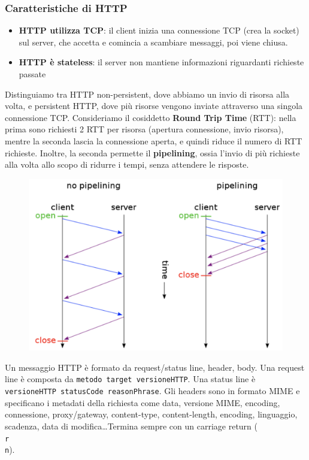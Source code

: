 \documentclass[11pt]{article}
\newcommand{\code}[1]{\texttt{#1}}
\begin{document}
\subsubsection{Caratteristiche di HTTP}
\begin{itemize}
    \item \textbf{HTTP utilizza TCP}: il client inizia una connessione TCP (crea la socket) sul server, che accetta e comincia a scambiare messaggi, poi viene chiusa.
    \item \textbf{HTTP è stateless}: il server non mantiene informazioni riguardanti richieste passate 
\end{itemize}
Distinguiamo tra HTTP non-persistent, dove abbiamo un invio di risorsa alla volta, e persistent HTTP, dove più risorse vengono inviate attraverso una singola connessione TCP. Consideriamo il cosiddetto \textbf{Round Trip Time} (RTT): nella prima sono richiesti 2 RTT per risorsa (apertura connessione, invio risorsa), mentre la seconda lascia la connessione aperta, e quindi riduce il numero di RTT richieste. Inoltre, la seconda permette il \textbf{pipelining}, ossia l'invio di più richieste alla volta allo scopo di ridurre i tempi, senza attendere le risposte.
\begin{figure}[H]
    \centering
    \includegraphics[width=0.6\linewidth]{res/pipelining.png}
\end{figure}
Un messaggio HTTP è formato da request/status line, header, body. Una request line è composta da \code{metodo target versioneHTTP}. Una status line è \code{versioneHTTP statusCode reasonPhrase}. Gli headers sono in formato MIME e specificano i metadati della richiesta come data, versione MIME, encoding, connessione, proxy/gateway, content-type, content-length, encoding, linguaggio, scadenza, data di modifica\dots Termina sempre con un carriage return (\code{\\r\\n}). 
\end{document}
